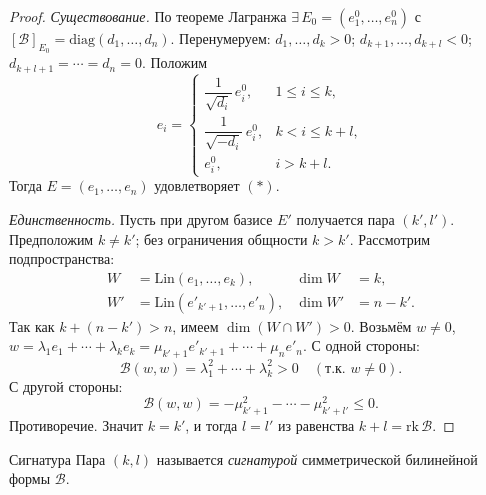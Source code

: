 \begin{proof}
	\textit{Существование.}
	По теореме Лагранжа $\exists\, E_0 = (e^0_1,\ldots,e^0_n)$ с $[\mathcal{B}]_{E_0} = \mathrm{diag}(d_1,\ldots,d_n)$.
	Перенумеруем: $d_1,\ldots,d_k > 0$;\; $d_{k+1},\ldots,d_{k+l} < 0$;\; $d_{k+l+1} = \cdots = d_n = 0$.
	Положим
	\[
	e_i = \begin{cases}
		\dfrac{1}{\sqrt{d_i}}\,e^0_i, & 1 \leq i \leq k, \\[5pt]
		\dfrac{1}{\sqrt{-d_i}}\,e^0_i, & k < i \leq k+l, \\[5pt]
		e^0_i, & i > k+l.
	\end{cases}
	\] 
	Тогда $E = (e_1,\ldots,e_n)$ удовлетворяет $(*)$.

	\textit{Единственность.}
	Пусть при другом базисе $E'$ получается пара $(k', l')$.
	Предположим $k \neq k'$; без ограничения общности $k > k'$.
	Рассмотрим подпространства:
	\begin{align*}
		W  &= \mathrm{Lin}(e_1,\ldots,e_k), &\dim W  &= k, \\
		W' &= \mathrm{Lin}(e'_{k'+1},\ldots,e'_n), &\dim W' &= n-k'.
	\end{align*} 
	Так как $k + (n-k') > n$, имеем $\dim(W \cap W') > 0$.
	Возьмём $w \neq 0$,\; $w = \lambda_1 e_1 + \cdots + \lambda_k e_k = \mu_{k'+1}e'_{k'+1} + \cdots + \mu_n e'_n$.
	С одной стороны:
	\[
	\mathcal{B}(w,w) = \lambda_1^2 + \cdots + \lambda_k^2 > 0 \quad (\text{т.к.\ } w \neq 0).
	\] 
	С другой стороны:
	\[
	\mathcal{B}(w,w) = -\mu_{k'+1}^2 - \cdots - \mu_{k'+l'}^2 \leq 0.
	\] 
	Противоречие.
	Значит $k = k'$, и тогда $l = l'$ из равенства $k + l = \mathrm{rk}\,\mathcal{B}$.
\end{proof}

\begin{Definition}{Сигнатура}{}
	Пара $(k,l)$ называется \textit{сигнатурой} симметрической билинейной формы $\mathcal{B}$.
\end{Definition}